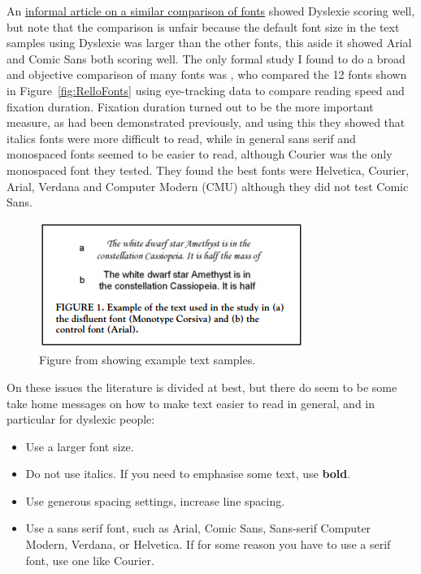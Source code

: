 \documentclass[17pt]{memoir}
\begin{document}
An \href{https://www.dyslexicadvantage.org/the-best-fonts-for-dyslexia/
}{informal article on a similar comparison of fonts} showed Dyslexie scoring well, but note that the comparison is unfair because the default font size in the text samples using Dyslexie was larger than the other fonts, this aside it showed Arial and Comic Sans both scoring well. The only formal study I found to do a broad and objective comparison of many fonts was \cite{Rello2013}, who compared the 12 fonts shown in Figure~\ref{fig:RelloFonts} using eye-tracking data to compare reading speed and fixation duration. Fixation duration turned out to be the more important measure, as had been demonstrated previously, and using this they showed that italics fonts were more difficult to read, while in general sans serif and  monospaced fonts seemed to be easier to read, although Courier was the only monospaced font they tested. They found the best fonts were Helvetica, Courier, Arial, Verdana and Computer Modern (CMU) although they did not test Comic Sans.  

\begin{figure}
\begin{center}
\includegraphics[scale=1.4]{figures/FrenchText.PNG}
\end{center}
\caption{Figure from \cite{French2013} showing example text samples. \label{fig:FrenchText}}
\end{figure}

On these issues the literature is divided at best, but there do seem to be some take home messages on how to make text easier to read in general, and in particular for dyslexic people:
\begin{itemize}
	\item {\huge Use a larger font size.}
	\item Do not use italics. If you need to emphasise some text, use \textbf{bold}.
	\item Use generous spacing settings, increase line spacing.
	\item Use a sans serif font, such as Arial, Comic Sans, Sans-serif Computer Modern, Verdana, or Helvetica. If for some reason you have to use a serif font, use one like Courier.
\end{itemize}
\end{document}
